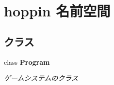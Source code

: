 \hypertarget{namespacehoppin}{}\section{hoppin 名前空間}
\label{namespacehoppin}
\subsection*{クラス}
\begin{DoxyCompactItemize}
\item 
class {\bfseries Program}
\begin{DoxyCompactList}\small\item\em ゲームシステムのクラス \end{DoxyCompactList}\end{DoxyCompactItemize}
